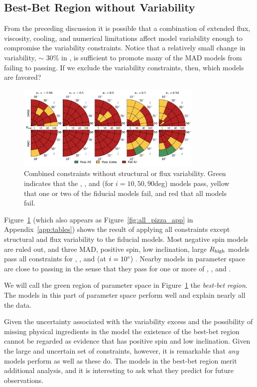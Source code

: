 \subsection{Best-Bet Region without Variability}

From the preceding discussion it is possible that a combination of extended flux, viscosity, cooling, and numerical limitations affect model variability enough to compromise the variability constraints.
Notice that a relatively small change in variability, $\sim$ 30\% in , is sufficient to promote many of the MAD models from failing to passing.
If we exclude the variability constraints, then, which models are favored?

\begin{figure}
  \centering
  \includegraphics[width=0.8\textwidth]{./figures/All_Constraints.png}
  \caption{Combined constraints without structural or flux variability.
Green indicates that the \kharma, \bhac, and (for $i = 10, 50, 90$deg) \hamr models pass, yellow that one or two of the fiducial models fail, and red that all models fail.}
  \label{fig:all_pizza}
\end{figure}

Figure~\ref{fig:all_pizza} (which also appears as  Figure~\ref{fig:all_pizza_app} in Appendix~\ref{app:tables}) shows the result of applying all constraints except structural and flux variability to the fiducial models.
Most negative spin models are ruled out, and three MAD, positive spin, low inclination, large $R_\mathrm{high}$ models pass all constraints for \kharma, \bhac, and (at $i = 10\degree$) \hamr.
Nearby models in parameter space are close to passing in the sense that they pass for one or more of \kharma, \bhac, and \hamr.

We will call the green region of parameter space in Figure~\ref{fig:all_pizza} the {\em best-bet region}.
The models in this part of parameter space perform well and explain nearly all the data.

Given the uncertainty associated with the variability excess and the possibility of missing physical ingredients in the model the existence of the best-bet region cannot be regarded as evidence that \sgra has positive spin and low inclination.
Given the large and uncertain set of constraints, however, it is remarkable that {\em any} models perform as well as these do.
The models in the best-bet region merit additional analysis, and it is interesting to ask what they predict for future observations.

